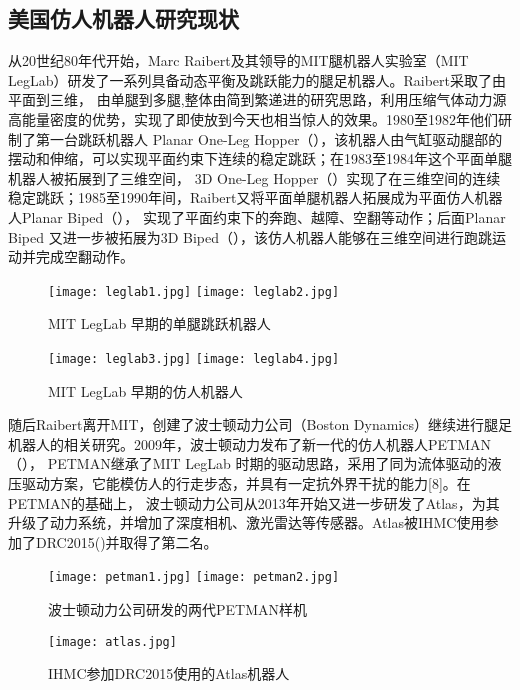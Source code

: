 \subsection{美国仿人机器人研究现状}
从20世纪80年代开始，Marc Raibert及其领导的MIT腿机器人实验室（MIT LegLab）研发了一系列具备动态平衡及跳跃能力的腿足机器人。Raibert采取了由平面到三维，
由单腿到多腿,整体由简到繁递进的研究思路，利用压缩气体动力源高能量密度的优势，实现了即使放到今天也相当惊人的效果。1980至1982年他们研制了第一台跳跃机器人
Planar One-Leg Hopper（），该机器人由气缸驱动腿部的摆动和伸缩，可以实现平面约束下连续的稳定跳跃；在1983至1984年这个平面单腿机器人被拓展到了三维空间，
3D One-Leg Hopper（）实现了在三维空间的连续稳定跳跃；1985至1990年间，Raibert又将平面单腿机器人拓展成为平面仿人机器人Planar Biped（），
实现了平面约束下的奔跑、越障、空翻等动作；后面Planar Biped 又进一步被拓展为3D Biped（），该仿人机器人能够在三维空间进行跑跳运动并完成空翻动作\cite{raibert1986legged}。
\begin{figure}[htbp]
    \centering
        {%
            \texttt{[image: leglab1.jpg]}}
        {%
            \texttt{[image: leglab2.jpg]}}
    \caption{MIT LegLab 早期的单腿跳跃机器人\label{fig:leglab}}
\end{figure}

\begin{figure}[htbp]
    \centering
        {%
            \texttt{[image: leglab3.jpg]}}
        {%
            \texttt{[image: leglab4.jpg]}}
    \caption{MIT LegLab 早期的仿人机器人\label{fig:leglab_biped}}
\end{figure}

随后Raibert离开MIT，创建了波士顿动力公司（Boston Dynamics）继续进行腿足机器人的相关研究。2009年，波士顿动力发布了新一代的仿人机器人PETMAN（），
PETMAN继承了MIT LegLab 时期的驱动思路，采用了同为流体驱动的液压驱动方案，它能模仿人的行走步态，并具有一定抗外界干扰的能力[8]。在PETMAN的基础上，
波士顿动力公司从2013年开始又进一步研发了Atlas，为其升级了动力系统，并增加了深度相机、激光雷达等传感器。Atlas被IHMC使用参加了DRC2015()并取得了第二名。
\begin{figure}[htbp]
    \centering
        {%
            \texttt{[image: petman1.jpg]}}
        {%
            \texttt{[image: petman2.jpg]}}
    \caption{波士顿动力公司研发的两代PETMAN样机\label{fig:leglab_biped}}
\end{figure}
\begin{figure}[htbp]
    \centering
    \texttt{[image: atlas.jpg]}
    \caption{\label{fig:atlas}IHMC参加DRC2015使用的Atlas机器人}
\end{figure}

